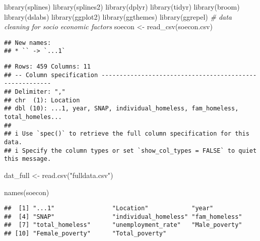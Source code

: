 \documentclass[
]{article}
\newenvironment{Shaded}{\begin{snugshade}}{\end{snugshade}}
\newcommand{\CommentTok}[1]{\textcolor[rgb]{0.56,0.35,0.01}{\textit{#1}}}
\newcommand{\FunctionTok}[1]{\textcolor[rgb]{0.00,0.00,0.00}{#1}}
\newcommand{\NormalTok}[1]{#1}
\newcommand{\OtherTok}[1]{\textcolor[rgb]{0.56,0.35,0.01}{#1}}
\newcommand{\StringTok}[1]{\textcolor[rgb]{0.31,0.60,0.02}{#1}}
\begin{document}
\begin{Shaded}
\begin{Highlighting}[]
\FunctionTok{library}\NormalTok{(splines)}
\FunctionTok{library}\NormalTok{(splines2)  }
\FunctionTok{library}\NormalTok{(dplyr)}
\FunctionTok{library}\NormalTok{(tidyr)}
\FunctionTok{library}\NormalTok{(broom)}
\FunctionTok{library}\NormalTok{(dslabs)}
\FunctionTok{library}\NormalTok{(ggplot2)}
\FunctionTok{library}\NormalTok{(ggthemes)}
\FunctionTok{library}\NormalTok{(ggrepel)}
\CommentTok{\# data cleaning for socio economic factors}
\NormalTok{soecon }\OtherTok{\textless{}{-}} \FunctionTok{read\_csv}\NormalTok{(}\StringTok{\textquotesingle{}soecon.csv\textquotesingle{}}\NormalTok{)}
\end{Highlighting}
\end{Shaded}

\begin{verbatim}
## New names:
## * `` -> `...1`
\end{verbatim}

\begin{verbatim}
## Rows: 459 Columns: 11
## -- Column specification --------------------------------------------------------
## Delimiter: ","
## chr  (1): Location
## dbl (10): ...1, year, SNAP, individual_homeless, fam_homeless, total_homeles...
## 
## i Use `spec()` to retrieve the full column specification for this data.
## i Specify the column types or set `show_col_types = FALSE` to quiet this message.
\end{verbatim}

\begin{Shaded}
\begin{Highlighting}[]
\NormalTok{dat\_full }\OtherTok{\textless{}{-}} \FunctionTok{read.csv}\NormalTok{(}\StringTok{"fulldata.csv"}\NormalTok{)}
\end{Highlighting}
\end{Shaded}

\begin{Shaded}
\begin{Highlighting}[]
\FunctionTok{names}\NormalTok{(soecon)}
\end{Highlighting}
\end{Shaded}

\begin{verbatim}
##  [1] "...1"                "Location"            "year"               
##  [4] "SNAP"                "individual_homeless" "fam_homeless"       
##  [7] "total_homeless"      "unemployment_rate"   "Male_poverty"       
## [10] "Female_poverty"      "Total_poverty"
\end{verbatim}
\end{document}

